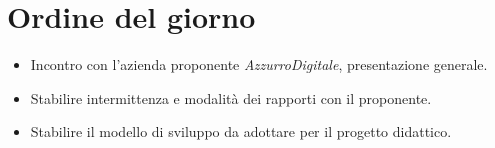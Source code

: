 

\section{Ordine del giorno}

\begin{itemize}
    \item Incontro con l'azienda proponente \emph{AzzurroDigitale}, presentazione generale.
    \item Stabilire intermittenza e modalità dei rapporti con il proponente.
    \item Stabilire il modello di sviluppo da adottare per il progetto didattico.
\end{itemize}
